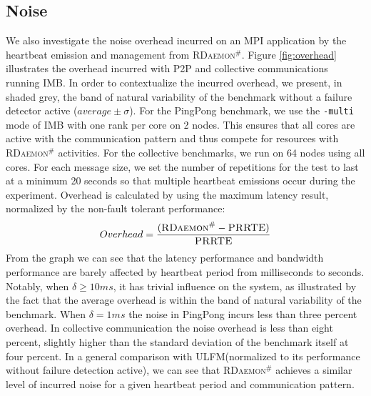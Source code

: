 \documentclass[sigconf]{acmart}
\newcommand{\prrte}[0]{\textsc{PRRTE}\xspace}
\newcommand{\ulfm}[0]{\textsc{ULFM}\xspace}
\newcommand{\ourwork}[0]{\textsc{RDaemon}\ensuremath{^\#}\xspace}
\newcommand{\imb}[0]{\textsc{IMB}\xspace}
\begin{document}
\subsection{Noise}
We also investigate the noise overhead incurred on an MPI application by the heartbeat emission
and management from \ourwork.
Figure \ref{fig:overhead} illustrates the overhead incurred with P2P and collective communications running \imb.
In order to contextualize the incurred overhead, we present, in shaded grey, the band of natural variability
of the benchmark without a failure detector active ($average \pm \sigma$).
For the PingPong benchmark, we use the \texttt{-multi} mode of IMB with one rank per core on 2 nodes.
This ensures that all cores are active with the communication pattern and thus
compete for resources with \ourwork activities.
For the collective benchmarks, we run on 64 nodes using all cores. For each message size, we set the number of
repetitions for the test to last at a minimum 20 seconds so that multiple heartbeat emissions occur during the experiment. Overhead is calculated by using the maximum latency result, normalized by the non-fault tolerant performance:
\begin{equation}
Overhead = \frac{( {\ourwork - \prrte} )}{\prrte}
\end{equation}
 From the graph we can see that the latency performance and bandwidth performance are barely affected by heartbeat period from milliseconds to seconds. Notably, when $ \delta \geq 10 ms $, it has trivial influence on the system, as illustrated by the fact that the average overhead is within the band of natural variability of the benchmark. When  $ \delta = 1 ms $ the noise in PingPong incurs less than three percent overhead. In collective communication the noise overhead is less than eight percent, slightly higher than the standard deviation of the benchmark itself at four percent.
 In a general comparison with \ulfm (normalized to its performance without failure detection active),
 we can see that \ourwork achieves a similar level of incurred noise for a given
 heartbeat period and communication pattern.
\end{document}
